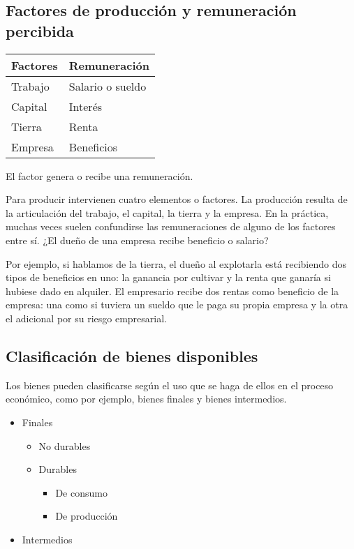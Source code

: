 \subsection{Factores de producción y remuneración percibida}

\vspace{.5cm}
\begin{table}[H]
    \centering
    \begin{tabular}{ll}
        Factores & Remuneración     \\
        \hline
        Trabajo  & Salario o sueldo \\
        Capital  & Interés          \\
        Tierra   & Renta            \\
        Empresa  & Beneficios       \\
        \hline
    \end{tabular}
\end{table}
\vspace{.5cm}

El factor genera o recibe una remuneración.

Para producir intervienen cuatro elementos o factores.
La producción resulta de la articulación del trabajo, el capital, la tierra y la empresa.
En la práctica,
muchas veces suelen confundirse las remuneraciones de alguno de los factores entre sí.
¿El dueño de una empresa recibe beneficio o salario?

Por ejemplo,
si hablamos de la tierra,
el dueño al explotarla está recibiendo dos tipos de beneficios en uno:
la ganancia por cultivar y la renta que ganaría si hubiese dado en alquiler.
El empresario recibe dos rentas como beneficio de la empresa:
una como si tuviera un sueldo que le paga su propia empresa
y la otra el adicional por su riesgo empresarial.

\subsection{Clasificación de bienes disponibles}

Los bienes pueden clasificarse según el uso que se haga de ellos en el proceso económico,
como por ejemplo,
bienes finales y bienes intermedios.

\begin{itemize}
    \item Finales
          \begin{itemize}
              \item No durables
              \item Durables
                    \begin{itemize}
                        \item De consumo
                        \item De producción
                    \end{itemize}
          \end{itemize}
    \item Intermedios
\end{itemize}

